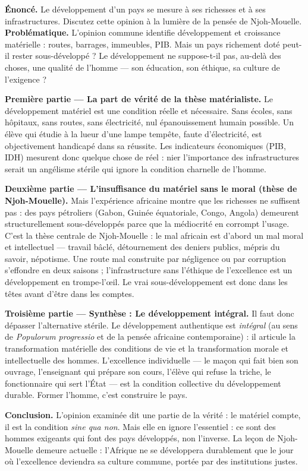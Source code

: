 \documentclass[11pt]{article}
\begin{document}
\begin{exoresolu}
\textbf{Énoncé.} \guillemotleft Le développement d'un pays se mesure à ses richesses et à ses infrastructures. \guillemotright Discutez cette opinion à la lumière de la pensée de Njoh-Mouelle.
\tcblower
\textbf{Problématique.} L'opinion commune identifie développement et croissance matérielle : routes, barrages, immeubles, PIB. Mais un pays richement doté peut-il rester sous-développé ? Le développement ne suppose-t-il pas, au-delà des choses, une qualité de l'homme — son éducation, son éthique, sa culture de l'exigence ?

\textbf{Première partie — La part de vérité de la thèse matérialiste.} Le développement matériel est une condition réelle et nécessaire. Sans écoles, sans hôpitaux, sans routes, sans électricité, nul épanouissement humain possible. Un élève qui étudie à la lueur d'une lampe tempête, faute d'électricité, est objectivement handicapé dans sa réussite. Les indicateurs économiques (PIB, IDH) mesurent donc quelque chose de réel : nier l'importance des infrastructures serait un angélisme stérile qui ignore la condition charnelle de l'homme.

\textbf{Deuxième partie — L'insuffisance du matériel sans le moral (thèse de Njoh-Mouelle).} Mais l'expérience africaine montre que les richesses ne suffisent pas : des pays pétroliers (Gabon, Guinée équatoriale, Congo, Angola) demeurent structurellement sous-développés parce que la médiocrité en corrompt l'usage. C'est la thèse centrale de Njoh-Mouelle : le mal africain est d'abord un mal moral et intellectuel — travail bâclé, détournement des deniers publics, mépris du savoir, népotisme. Une route mal construite par négligence ou par corruption s'effondre en deux saisons ; l'infrastructure sans l'éthique de l'excellence est un développement en trompe-l'œil. Le vrai sous-développement est donc dans les têtes avant d'être dans les comptes.

\textbf{Troisième partie — Synthèse : Le développement intégral.} Il faut donc dépasser l'alternative stérile. Le développement authentique est \emph{intégral} (au sens de \emph{Populorum progressio} et de la pensée africaine contemporaine) : il articule la transformation matérielle des conditions de vie et la transformation morale et intellectuelle des hommes. L'excellence individuelle — le maçon qui fait bien son ouvrage, l'enseignant qui prépare son cours, l'élève qui refuse la triche, le fonctionnaire qui sert l'État — est la condition collective du développement durable. Former l'homme, c'est construire le pays.

\textbf{Conclusion.} L'opinion examinée dit une partie de la vérité : le matériel compte, il est la condition \emph{sine qua non}. Mais elle en ignore l'essentiel : ce sont des hommes exigeants qui font des pays développés, non l'inverse. La leçon de Njoh-Mouelle demeure actuelle : l'Afrique ne se développera durablement que le jour où l'excellence deviendra sa culture commune, portée par des institutions justes.
\end{exoresolu}
\end{document}
